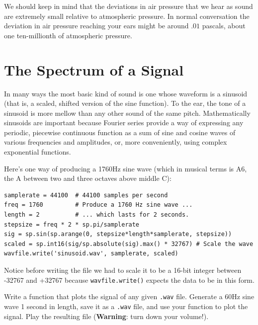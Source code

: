 We should keep in mind that the deviations in air pressure that we hear as sound are extremely small relative to atmospheric pressure.
In normal conversation the deviation in air pressure reaching your ears might be around $.01$ pascals, about one ten-millionth of atmospheric pressure.


\section*{The Spectrum of a Signal}

In many ways the most basic kind of sound is one whose waveform is a sinusoid (that is, a scaled, shifted version of the sine function). 
To the ear, the tone of a sinusoid is more mellow than any other sound of the same pitch. 
Mathematically sinusoids are important because Fourier series provide a way of expressing any periodic, piecewise continuous function as a sum of sine and cosine waves of various frequencies and amplitudes, or, more conveniently, using complex exponential functions.

Here's one way of producing a 1760Hz sine wave (which in musical terms is A6, the A between two and three octaves above middle C):

\begin{lstlisting}
samplerate = 44100	# 44100 samples per second
freq = 1760			# Produce a 1760 Hz sine wave ...
length = 2			# ... which lasts for 2 seconds.
stepsize = freq * 2 * sp.pi/samplerate
sig = sp.sin(sp.arange(0, stepsize*length*samplerate, stepsize))
scaled = sp.int16(sig/sp.absolute(sig).max() * 32767) # Scale the wave
wavfile.write('sinusoid.wav', samplerate, scaled)
\end{lstlisting}

Notice before writing the file we had to scale it to be a 16-bit integer between -32767 and +32767 because \texttt{wavfile.write()} expects the data to be in this form.

\begin{problem} %
Write a function that plots the signal of any given \texttt{.wav} file. Generate a 60Hz sine wave 1 second in length, save it as a \texttt{.wav} file, and use your function to plot the signal. Play the resulting file (\textbf{Warning}: turn down your volume!).
\end{problem}


